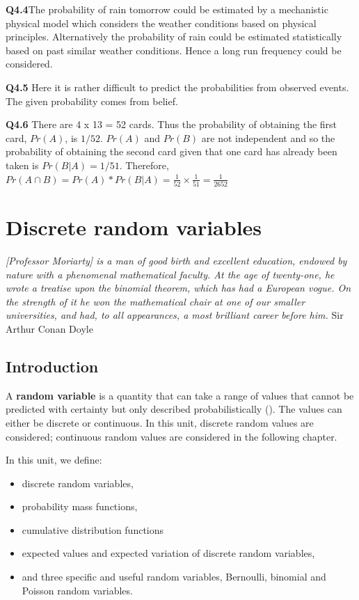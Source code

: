 \documentclass[
  oneside]{krantz}
\begin{document}
\textbf{Q4.4}The probability of rain tomorrow could be estimated by a mechanistic physical model which considers the weather conditions based on physical principles. Alternatively the probability of rain could be estimated statistically based on past similar weather conditions. Hence a long run frequency could be considered.

\textbf{Q4.5} Here it is rather difficult to predict the probabilities from observed events. The given probability comes from belief.

\textbf{Q4.6} There are 4 x 13 = 52 cards. Thus the probability of obtaining the first card, \(Pr(A)\), is \(1/52\). \(Pr(A)\) and \(Pr(B)\) are not independent and so the probability of obtaining the second card given that one card has already been taken is \(Pr(B|A) = 1/51\). Therefore, \(Pr(A \cap B) = Pr(A) * Pr(B | A) = \frac{1}{52} \times \frac{1}{51} = \frac{1}{2652}\)

\hypertarget{discreterv}{%
\chapter{Discrete random variables}\label{discreterv}}

\emph{{[}Professor Moriarty{]} is a man of good birth and excellent education, endowed by nature with a phenomenal mathematical faculty. At the age of twenty-one, he wrote a treatise upon the binomial theorem, which has had a European vogue. On the strength of it he won the mathematical chair at one of our smaller universities, and had, to all appearances, a most brilliant career before him.} Sir Arthur Conan Doyle \citeyearpar{Doyle1894}

\hypertarget{INTdiscrv}{%
\section{Introduction}\label{INTdiscrv}}

A \textbf{random variable} is a quantity that can take a range of values that cannot be predicted with certainty but only described probabilistically (\citet{BorowskiBorwein}). The values can either be discrete or continuous. In this unit, discrete random values are considered; continuous random values are considered in the following chapter.

In this unit, we define:

\begin{itemize}
\item
  discrete random variables,
\item
  probability mass functions,
\item
  cumulative distribution functions
\item
  expected values and expected variation of discrete random variables,
\item
  and three specific and useful random variables, Bernoulli, binomial and Poisson random variables.
\end{itemize}
\end{document}
